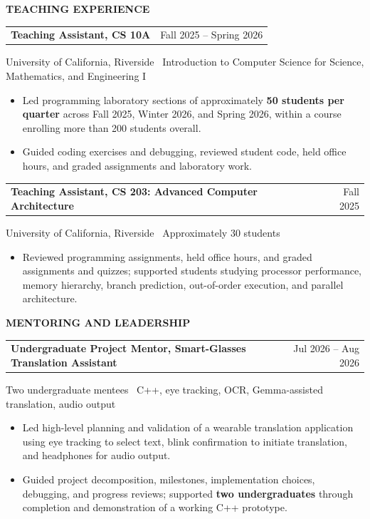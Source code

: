 \documentclass[11pt]{article}
\makeatletter
\newcommand{\resheading}[1]{%
  \par\addvspace{10pt}%
  \noindent\colorbox{sectiongray}{%
    \parbox{\dimexpr\linewidth-2\fboxsep\relax}{\strut\small\textbf{#1}}%
  }\par\nobreak\vspace{4pt}\nopagebreak[4]%
}
\newcommand{\resumeentry}[3]{%
  \par\addvspace{6pt}%
  \begin{tabularx}{\linewidth}{@{}>{\raggedright\arraybackslash}X@{\hspace{1em}}r@{}}%
    \textbf{#1} & {\small #2}\\%
  \end{tabularx}\par\nobreak%
  {\small #3\par}\nobreak\nopagebreak[4]%
}
\makeatother
\begin{document}
\newpage
\resheading{TEACHING EXPERIENCE}
\resumeentry{Teaching Assistant, CS 10A}
  {Fall 2025 -- Spring 2026}
  {University of California, Riverside \textbar\ Introduction to Computer Science for Science, Mathematics, and Engineering I}
\begin{itemize}
  \item Led programming laboratory sections of approximately \textbf{50 students per quarter} across Fall 2025, Winter 2026, and Spring 2026, within a course enrolling more than 200 students overall.
  \item Guided coding exercises and debugging, reviewed student code, held office hours, and graded assignments and laboratory work.
\end{itemize}
\resumeentry{Teaching Assistant, CS 203: Advanced Computer Architecture}
  {Fall 2025}
  {University of California, Riverside \textbar\ Approximately 30 students}
\begin{itemize}
  \item Reviewed programming assignments, held office hours, and graded assignments and quizzes; supported students studying processor performance, memory hierarchy, branch prediction, out-of-order execution, and parallel architecture.
\end{itemize}

\resheading{MENTORING AND LEADERSHIP}
\resumeentry{Undergraduate Project Mentor, Smart-Glasses Translation Assistant}
  {Jul 2026 -- Aug 2026}
  {Two undergraduate mentees \textbar\ C++, eye tracking, OCR, Gemma-assisted translation, audio output}
\begin{itemize}
  \item Led high-level planning and validation of a wearable translation application using eye tracking to select text, blink confirmation to initiate translation, and headphones for audio output.
  \item Guided project decomposition, milestones, implementation choices, debugging, and progress reviews; supported \textbf{two undergraduates} through completion and demonstration of a working C++ prototype.
\end{itemize}
\end{document}
